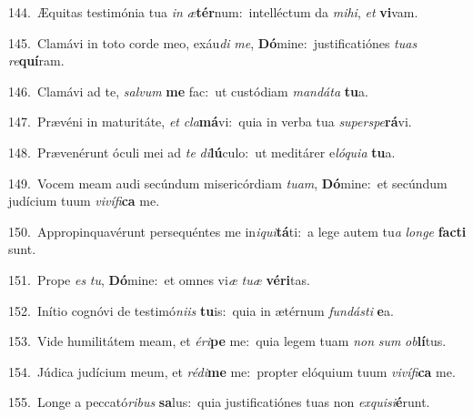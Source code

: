 {\numbfont\textcolor{\numbcolor}{144.}}~Æquitas testimónia tua \textit{in} \textit{æ}\-\textbf{tér}num:~\star intelléctum da \textit{mi}\-\textit{hi}, \textit{et} \textbf{vi}\-vam.\par
{\numbfont\textcolor{\numbcolor}{145.}}~Clamávi in toto corde meo, exáu\textit{di} \textit{me}\-, \textbf{Dó}\-mine:~\star justificatiónes \textit{tu}\-\textit{as} \textit{re}\-\textbf{quí}ram.\par
{\numbfont\textcolor{\numbcolor}{146.}}~Clamávi ad te, \textit{sal}\-\textit{vum} \textbf{me} fac:~\star ut custódiam \textit{man}\-\textit{dá}\textit{ta} \textbf{tu}\-a.\par
{\numbfont\textcolor{\numbcolor}{147.}}~Prævéni in maturitáte, \textit{et} \textit{cla}\-\textbf{má}vi:~\star quia in verba tua \textit{su}\-\textit{per}\textit{spe}\textbf{rá}vi.\par
{\numbfont\textcolor{\numbcolor}{148.}}~Prævenérunt óculi mei ad \textit{te} \textit{di}\-\textbf{lú}culo:~\star ut meditárer e\-\textit{ló}\-\textit{qui}\textit{a} \textbf{tu}\-a.\par
{\numbfont\textcolor{\numbcolor}{149.}}~Vocem meam audi secúndum misericórdiam \textit{tu}\-\textit{am}, \textbf{Dó}\-mine:~\star et secúndum judícium tuum \textit{vi}\-\textit{ví}\textit{fi}\textbf{ca} me.\par
{\numbfont\textcolor{\numbcolor}{150.}}~Appropinquavérunt persequéntes me in\-\textit{i}\-\textit{qui}\textbf{tá}ti:~\star a lege autem tu\textit{a} \textit{lon}\-\textit{ge} \textbf{fac}\-\textbf{ti} sunt.\par
{\numbfont\textcolor{\numbcolor}{151.}}~Prope \textit{es} \textit{tu}\-, \textbf{Dó}\-mine:~\star et omnes vi\textit{æ} \textit{tu}\-\textit{æ} \textbf{vé}\-\textbf{ri}tas.\par
{\numbfont\textcolor{\numbcolor}{152.}}~Inítio cognóvi de testimó\-\textit{ni}\-\textit{is} \textbf{tu}\-is:~\star quia in ætérnum \textit{fun}\-\textit{dás}\textit{ti} \textbf{e}\-a.\par
{\numbfont\textcolor{\numbcolor}{153.}}~Vide humilitátem meam, et \textit{é}\-\textit{ri}\textbf{pe} me:~\star quia legem tuam \textit{non} \textit{sum} \textit{ob}\-\textbf{lí}tus.\par
{\numbfont\textcolor{\numbcolor}{154.}}~Júdica judícium meum, et \textit{réd}\-\textit{i}\textbf{me} me:~\star propter elóquium tuum \textit{vi}\-\textit{ví}\textit{fi}\textbf{ca} me.\par
{\numbfont\textcolor{\numbcolor}{155.}}~Longe a peccató\-\textit{ri}\-\textit{bus} \textbf{sa}\-lus:~\star quia justificatiónes tuas non \textit{ex}\-\textit{qui}\textit{si}\textbf{é}runt.\par
